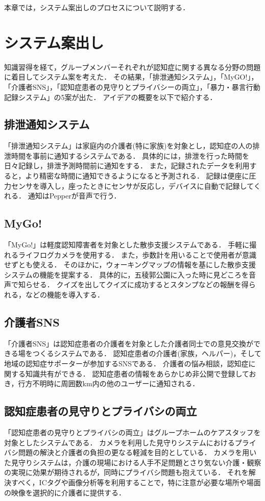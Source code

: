 \documentclass[../report]{subfiles}
\begin{document}
本章では，システム案出しのプロセスについて説明する．

\section{システム案出し}\label{sec:andashi}
知識習得を経て，グループメンバーそれぞれが認知症に関する異なる分野の問題に着目してシステム案を考えた．
その結果，「排泄通知システム」，「MyGO!」，「介護者SNS」，「認知症患者の見守りとプライバシーの両立」，「暴力・暴言行動記録システム」の5案が出た．
アイデアの概要を以下で紹介する．

\subsection{排泄通知システム}
「排泄通知システム」は家庭内の介護者(特に家族)を対象とし，認知症の人の排泄時間を事前に通知するシステムである．
具体的には，排泄を行った時間を日々記録し，排泄予測時間前に通知をする．
また，記録されたデータを利用すると，より精密な時間に通知できるようになると予測される．
記録は便座に圧力センサを導入し，座ったときにセンサが反応し，デバイスに自動で記録してくれる．
通知はPepperが音声で行う．

\subsection{MyGo!}
「MyGo!」は軽度認知障害者を対象とした散歩支援システムである．
手軽に撮れるライフログカメラを使用する．
また，歩数計を用いることで使用者が意識せずとも使える．
そのほかに，ウォーキングマップの情報を基にした散歩支援システムの機能を提案する．
具体的に，五稜郭公園に入った時に見どころを音声で知らせる．
クイズを出してクイズに成功するとスタンプなどの報酬を得られる，などの機能を導入する．

\subsection{介護者SNS}
「介護者SNS」は認知症患者の介護者を対象とした介護者同士での意見交換ができる場をつくるシステムである．
認知症患者の介護者(家族，ヘルパー)，そして地域の認知症サポーターが参加するSNSである．
介護者の悩み相談，認知症に関する知識共有ができる．
認知症患者の情報をあらかじめ非公開で登録しておき，行方不明時に周囲数km内の他のユーザーに通知される．

\subsection{認知症患者の見守りとプライバシの両立}
「認知症患者の見守りとプライバシの両立」はグループホームのケアスタッフを対象としたシステムである．
カメラを利用した見守りシステムにおけるプライバシ問題の解決と介護者の負担の更なる軽減を目的としている．
カメラを用いた見守りシステムは，介護の現場における人手不足問題とさり気ない介護・観察の実現に効果が期待されるが，同時にプライバシ問題も抱えている．
それを解決すべく，ICタグや画像分析等を利用することで，特に注意が必要な場所や場面の映像を選択的に介護者に提供する．
\end{document}
